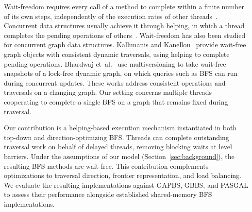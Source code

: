 Wait-freedom requires every call of a method to complete within a finite number of its own steps, independently of the execution rates of other threads~\cite{herlihy_waitfree}. Concurrent data structures usually achieve it through helping, in which a thread completes the pending operations of others~\cite{aomp, kogan_fastwf}. Wait-freedom has also been studied for concurrent graph data structures. Kallimanis and Kanellou~\cite{kallimanis_graph} provide wait-free graph objects with consistent dynamic traversals, using helping to complete pending operations. Bhardwaj et~al.~\cite{graph_snapshots} use multiversioning to take wait-free snapshots of a lock-free dynamic graph, on which queries such as BFS can run during concurrent updates. These works address consistent operations and traversals on a changing graph. Our setting concerns multiple threads cooperating to complete a single BFS on a graph that remains fixed during traversal.

Our contribution is a helping-based execution mechanism instantiated in both top-down and direction-optimizing BFS. Threads can complete outstanding traversal work on behalf of delayed threads, removing blocking waits at level barriers. Under the assumptions of our model (Section~\ref{sec:background}), the resulting BFS methods are wait-free. This contribution complements optimizations to traversal direction, frontier representation, and load balancing. We evaluate the resulting implementations against GAPBS, GBBS, and PASGAL to assess their performance alongside established shared-memory BFS implementations.
